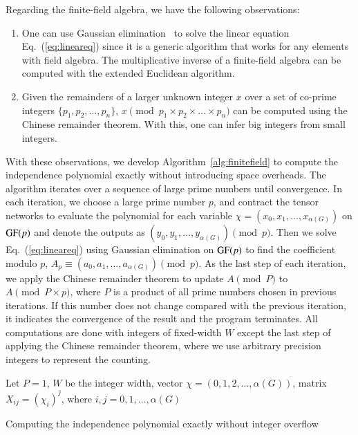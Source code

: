 \documentclass[onefignum, onetabnum]{siamart190516}
\newcommand{\<}{\langle}
\renewcommand{\>}{\rangle}
\newcommand{\Eq}[1]{Eq.~(\ref{#1})}
\begin{document}
Regarding the finite-field algebra, we have the following observations:
\begin{enumerate}
    \item One can use Gaussian elimination~\cite{Golub2013} to solve the linear equation \Eq{eq:lineareq} since it is a generic algorithm that works for any elements with field algebra. The multiplicative inverse of a finite-field algebra can be computed with the extended Euclidean algorithm.
    \item Given the remainders of a larger unknown integer $x$ over a set of co-prime integers $\{p_1, p_2, \ldots, p_n\}$,
    $x \pmod {p_1 \times p_2 \times \ldots \times p_n}$ can be computed using the Chinese remainder theorem. With this, one can infer big integers from small integers.
\end{enumerate}
With these observations, we develop Algorithm~\ref{alg:finitefield} to compute the independence polynomial exactly without introducing space overheads.
The algorithm iterates over a sequence of large prime numbers until convergence.
In each iteration, we choose a large prime number $p$, and contract the tensor networks to evaluate the polynomial for each variable $\chi = (x_{0}, x_{1}, \ldots, x_{\alpha(G)})$ on ${\rm GF}(p)$ and denote the outputs as $(y_0, y_1, \ldots, y_{\alpha(G)}) \pmod p$.
Then we solve \Eq{eq:lineareq} using Gaussian elimination on ${\rm GF}(p)$ to find the coefficient modulo $p$, $A_p \equiv (a_0, a_1, \ldots, a_{\alpha(G)})\pmod p$.
As the last step of each iteration, we apply the Chinese remainder theorem to update $A \pmod P $ to $ A \pmod {P\times p}$, where $P$ is a product of all prime numbers chosen in previous iterations.
If this number does not change compared with the previous iteration, it indicates the convergence of the result and the program terminates.
All computations are done with integers of fixed-width $W$ except the last step of applying the Chinese remainder theorem, where we use arbitrary precision integers to represent the counting.

\LinesNumberedHidden
\begin{algorithm}[!ht]
    \small
    \SetAlgoNoLine
    Let $P = 1$, $W$ be the integer width, vector $\chi = (0,1,2, \ldots, \alpha(G))$, matrix $X_{ij} = (\chi_i)^j$, where $i,j = 0, 1, \ldots, \alpha(G)$\;

    \caption{Computing the independence polynomial exactly without integer overflow}\label{alg:finitefield} 
\end{algorithm}
\end{document}
